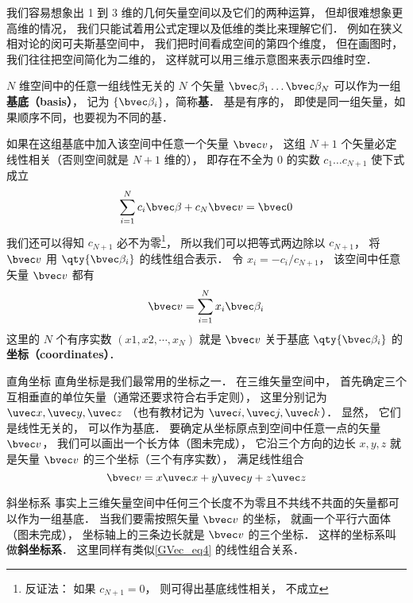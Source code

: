 我们容易想象出 1 到 3 维的几何矢量空间以及它们的两种运算， 但却很难想象更高维的情况， 我们只能试着用公式定理以及低维的类比来理解它们． 例如在狭义相对论的闵可夫斯基空间中， 我们把时间看成空间的第四个维度， 但在画图时， 我们往往把空间简化为二维的， 这样就可以用三维示意图来表示四维时空．

$N$ 维空间中的任意一组线性无关的 $N$ 个矢量 $\bvec \beta_1\dots \bvec \beta_N$ 可以作为一组\textbf{基底（basis）}， 记为 $\{\bvec \beta_i\}$，简称\textbf{基}． 基是有序的， 即使是同一组矢量，如果顺序不同，也要视为不同的基．

如果在这组基底中加入该空间中任意一个矢量 $\bvec v$， 这组 $N+1$ 个矢量必定线性相关（否则空间就是 $N+1$ 维的）， 即存在不全为 0 的实数 $c_1\dots c_{N+1}$ 使下式成立
\begin{equation}
\sum_{i=1}^{N} c_i \bvec \beta + c_N \bvec v = \bvec 0
\end{equation}
我们还可以得知 $c_{N+1}$ 必不为零\footnote{反证法： 如果 $c_{N+1} = 0$， 则可得出基底线性相关， 不成立}， 所以我们可以把等式两边除以 $c_{N+1}$， 将 $\bvec v$ 用 $\qty{\bvec \beta_i}$ 的线性组合表示． 令 $x_i = -c_i/c_{N+1}$， 该空间中任意矢量 $\bvec v$ 都有
\begin{equation}\label{GVec_eq5}
\bvec v = \sum_{i=1}^N x_i \bvec \beta_i
\end{equation}
这里的 $N$ 个有序实数 $(x1, x2, \cdots, x_N)$ 就是 $\bvec v$ 关于基底 $\qty{\bvec \beta_i}$ 的\textbf{坐标（coordinates）}．

\begin{example}{直角坐标}
直角坐标是我们最常用的坐标之一． 在三维矢量空间中， 首先确定三个互相垂直的单位矢量（通常还要求符合右手定则）， 这里分别记为 $\uvec x, \uvec y, \uvec z$ （也有教材记为 $\uvec i, \uvec j, \uvec k$）． 显然， 它们是线性无关的， 可以作为基底． 要确定从坐标原点到空间中任意一点的矢量 $\bvec v$， 我们可以画出一个长方体（图未完成）， 它沿三个方向的边长 $x, y, z$ 就是矢量 $\bvec v$ 的三个坐标（三个有序实数）， 满足线性组合
\begin{equation}\label{GVec_eq4}
\bvec v = x\uvec x + y\uvec y + z\uvec z
\end{equation}
\end{example}

\begin{example}{斜坐标系}
事实上三维矢量空间中任何三个长度不为零且不共线不共面的矢量都可以作为一组基底． 当我们要需按照矢量 $\bvec v$ 的坐标， 就画一个平行六面体（图未完成）， 坐标轴上的三条边长就是 $\bvec v$ 的三个坐标． 这样的坐标系叫做\textbf{斜坐标系}． 这里同样有类似\autoref{GVec_eq4} 的线性组合关系．
\end{example}

